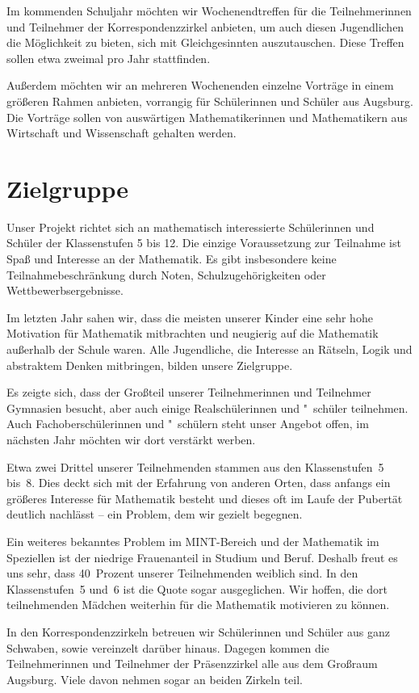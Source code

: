 \documentclass[12pt]{zettel}
\begin{document}
Im kommenden Schuljahr möchten wir Wochenendtreffen für die Teilnehmerinnen und
Teilnehmer der Korrespondenzzirkel anbieten, um auch diesen Jugendlichen die
Möglichkeit zu bieten, sich mit Gleichgesinnten auszutauschen. Diese Treffen
sollen etwa zweimal pro Jahr stattfinden.

Außerdem möchten wir an mehreren Wochenenden einzelne Vorträge in einem
größeren Rahmen anbieten, vorrangig für Schülerinnen und Schüler aus Augsburg.
Die Vorträge sollen von auswärtigen Mathematikerinnen und Mathematikern aus
Wirtschaft und Wissenschaft gehalten werden.


\section{Zielgruppe}

Unser Projekt richtet sich an mathematisch interessierte Schülerinnen
und Schüler der Klassenstufen 5 bis 12. Die einzige Voraussetzung zur
Teilnahme ist Spaß und Interesse an der Mathematik. Es gibt insbesondere
keine Teilnahmebeschränkung durch Noten, Schulzugehörigkeiten oder
Wettbewerbsergebnisse.

Im letzten Jahr sahen wir, dass die meisten unserer Kinder eine
sehr hohe Motivation für Mathematik mitbrachten und neugierig auf die
Mathematik außerhalb der Schule waren. Alle Jugendliche, die Interesse an
Rätseln, Logik und abstraktem Denken mitbringen, bilden unsere
Zielgruppe.

Es zeigte sich, dass der Großteil unserer Teilnehmerinnen und
Teilnehmer Gymnasien besucht, aber auch einige Realschülerinnen und "~schüler teilnehmen.
Auch Fachoberschülerinnen und "~schülern steht unser Angebot offen, im nächsten
Jahr möchten wir dort verstärkt werben.

Etwa zwei Drittel unserer Teilnehmenden
stammen aus den Klassenstufen~5 bis~8. 
Dies deckt sich mit der
Erfahrung von anderen Orten, dass anfangs ein größeres Interesse für
Mathematik besteht und dieses oft im Laufe der Pubertät
deutlich nachlässt -- ein Problem, dem wir gezielt begegnen.

Ein weiteres bekanntes Problem im MINT-Bereich
und der Mathematik im Speziellen ist der niedrige Frauenanteil in
Studium und Beruf. Deshalb freut es uns sehr, dass 40~Prozent unserer
Teilnehmenden weiblich sind. In den Klassenstufen~5 und~6 ist die Quote sogar
ausgeglichen. Wir hoffen, die dort teilnehmenden Mädchen weiterhin für die
Mathematik motivieren zu können.

In den Korrespondenzzirkeln betreuen wir Schülerinnen und Schüler aus ganz
Schwaben, sowie vereinzelt darüber hinaus. Dagegen kommen die Teilnehmerinnen
und Teilnehmer der Präsenzzirkel alle aus dem Großraum Augsburg. Viele davon
nehmen sogar an beiden Zirkeln teil.
\end{document}
